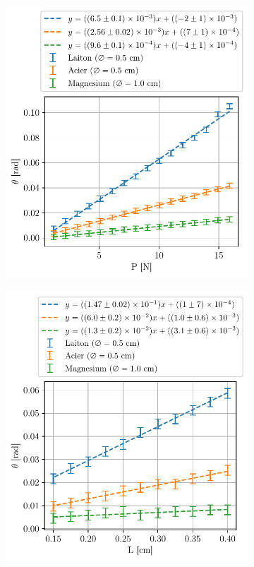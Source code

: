 \begin{figure}[h]
    \centering
    \begin{subfigure}{0.45\linewidth}
        \centering
        \includegraphics[width=\linewidth]{figures/methode_statique_masse.pdf}
        \caption{}
        \label{fig:statique_masse}
    \end{subfigure}
    \begin{subfigure}{0.45\linewidth}
        \centering
        \includegraphics[width=\linewidth]{figures/methode_statique_longueur.pdf}

\end{subfigure}
\end{figure}
